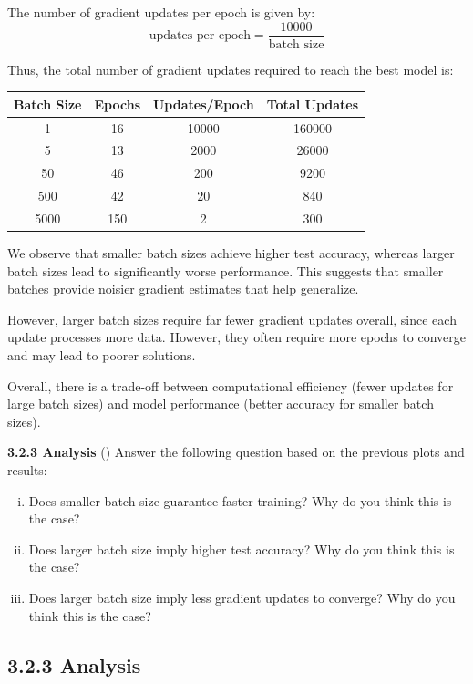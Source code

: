 The number of gradient updates per epoch is given by:
\[
\text{updates per epoch} = \frac{10000}{\text{batch size}}
\]

Thus, the total number of gradient updates required to reach the best model is:

\begin{center}
\begin{tabular}{c|c|c|c}
Batch Size & Epochs & Updates/Epoch & Total Updates \\
\hline
1 & 16 & 10000 & 160000 \\
5 & 13 & 2000 & 26000 \\
50 & 46 & 200 & 9200 \\
500 & 42 & 20 & 840 \\
5000 & 150 & 2 & 300 \\
\end{tabular}
\end{center}

We observe that smaller batch sizes achieve higher test accuracy, whereas larger batch sizes lead to significantly worse performance. This suggests that smaller batches provide noisier gradient estimates that help generalize.

However, larger batch sizes require far fewer gradient updates overall, since each update processes more data. However, they often require more epochs to converge and may lead to poorer solutions.

Overall, there is a trade-off between computational efficiency (fewer updates for large batch sizes) and model performance (better accuracy for smaller batch sizes).

\bigskip

\textbf{3.2.3 Analysis} () 
Answer the following question based on the previous plots and results:
\begin{enumerate}[(i).]
    \item Does smaller batch size guarantee faster training? Why do you think this is the case?
    \item Does larger batch size imply higher test accuracy? Why do you think this is the case?
    \item Does larger batch size imply less gradient updates to converge? Why do you think this is the case? 
\end{enumerate}

\subsection*{3.2.3 Analysis}

